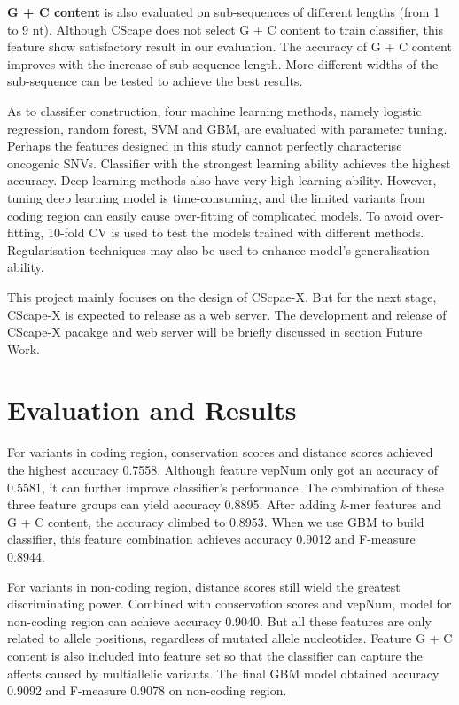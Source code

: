 \documentclass[a4paper,nohyper,nobib,openany,justified]{tufte-book}
\begin{document}
\begin{fullwidth}
\textbf{G + C content} is also evaluated on sub-sequences of different lengths (from 1 to 9 nt). Although CScape does not select G + C content to train classifier, this feature show satisfactory result in our evaluation. The accuracy of G + C content improves with the increase of sub-sequence length. More different widths of the sub-sequence can be tested to achieve the best results.

As to classifier construction, four machine learning methods, namely logistic regression, random forest, SVM and GBM, are evaluated with parameter tuning. Perhaps the features designed in this study cannot perfectly characterise oncogenic SNVs. Classifier with the strongest learning ability achieves the highest accuracy. Deep learning methods also have very high learning ability. However, tuning deep learning model is time-consuming, and the limited variants from coding region can easily cause over-fitting of complicated models. To avoid over-fitting, 10-fold CV is used to test the models trained with different methods. Regularisation techniques may also be used to enhance model's generalisation ability.

This project mainly focuses on the design of CScpae-X. But for the next stage, CScape-X is expected to release as a web server. The development and release of CScape-X pacakge and web server will be briefly discussed in section Future Work.

\section{Evaluation and Results}

For variants in coding region, conservation scores and distance scores achieved the highest accuracy 0.7558. Although feature vepNum only got an accuracy of 0.5581, it can further improve classifier's performance. The combination of these three feature groups can yield accuracy 0.8895. After adding \emph{k}-mer features and G + C content, the accuracy climbed to 0.8953. When we use GBM to build classifier, this feature combination achieves accuracy 0.9012 and F-measure 0.8944.

For variants in non-coding region, distance scores still wield the greatest discriminating power. Combined with conservation scores and vepNum, model for non-coding region can achieve accuracy 0.9040. But all these features are only related to allele positions, regardless of mutated allele nucleotides. Feature G + C content is also included into feature set so that the classifier can capture the affects caused by multiallelic variants. The final GBM model obtained accuracy 0.9092 and F-measure 0.9078 on non-coding region.


\end{fullwidth}
\end{document}
